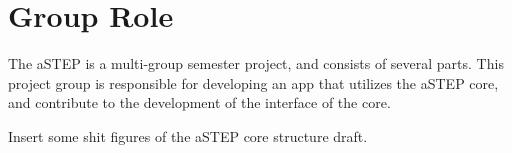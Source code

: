 \chapter{Group Role}
The aSTEP is a multi-group semester project, and consists of several parts. This project group is responsible for developing an app that utilizes the aSTEP core, and contribute to the development of the interface of the core.

Insert some shit figures of the aSTEP core structure draft.